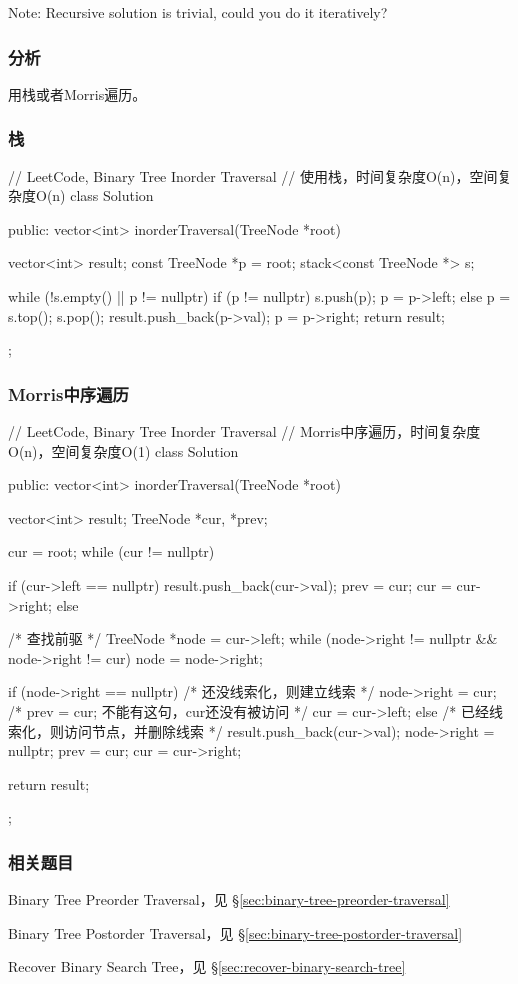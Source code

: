 Note: Recursive solution is trivial, could you do it iteratively?


\subsubsection{分析}
用栈或者Morris遍历。


\subsubsection{栈}
\begin{Code}
	// LeetCode, Binary Tree Inorder Traversal
	// 使用栈，时间复杂度O(n)，空间复杂度O(n)
	class Solution {
		public:
		vector<int> inorderTraversal(TreeNode *root) {
			vector<int> result;
			const TreeNode *p = root;
			stack<const TreeNode *> s;
			
			while (!s.empty() || p != nullptr) {
				if (p != nullptr) {
					s.push(p);
					p = p->left;
				} else {
				p = s.top();
				s.pop();
				result.push_back(p->val);
				p = p->right;
			}
		}
		return result;
	}
};
\end{Code}


\subsubsection{Morris中序遍历}
\begin{Code}
	// LeetCode, Binary Tree Inorder Traversal
	// Morris中序遍历，时间复杂度O(n)，空间复杂度O(1)
	class Solution {
		public:
		vector<int> inorderTraversal(TreeNode *root) {
			vector<int> result;
			TreeNode *cur, *prev;
			
			cur = root;
			while (cur != nullptr) {
				if (cur->left == nullptr) {
					result.push_back(cur->val);
					prev = cur;
					cur = cur->right;
				} else {
				/* 查找前驱 */
				TreeNode *node = cur->left;
				while (node->right != nullptr && node->right != cur)
				node = node->right;
				
				if (node->right == nullptr) { /* 还没线索化，则建立线索 */
					node->right = cur;
					/* prev = cur; 不能有这句，cur还没有被访问 */
					cur = cur->left;
				} else {    /* 已经线索化，则访问节点，并删除线索  */
				result.push_back(cur->val);
				node->right = nullptr;
				prev = cur;
				cur = cur->right;
			}
		}
	}
	return result;
}
};
\end{Code}


\subsubsection{相关题目}
\begindot
\item Binary Tree Preorder Traversal，见 \S \ref{sec:binary-tree-preorder-traversal}
\item Binary Tree Postorder Traversal，见 \S \ref{sec:binary-tree-postorder-traversal}
\item Recover Binary Search Tree，见 \S \ref{sec:recover-binary-search-tree}
\myenddot



